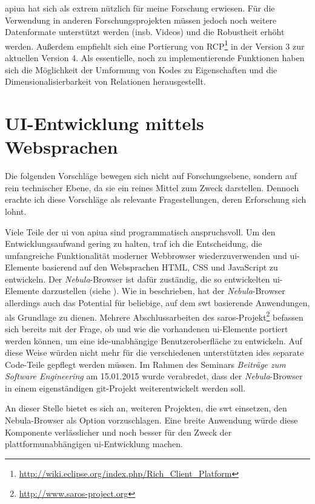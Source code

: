 \gls{apiua} hat sich als extrem nützlich für meine Forschung erwiesen. Für die Verwendung in anderen Forschungsprojekten müssen jedoch noch weitere Datenformate unterstützt werden (insb. Videos) und die Robustheit erhöht werden. Außerdem empfiehlt sich eine Portierung von RCP\footnote{\url{http://wiki.eclipse.org/index.php/Rich_Client_Platform}} in der Version 3 zur aktuellen Version 4. Als essentielle, noch zu implementierende Funktionen haben sich die Möglichkeit der Umformung von Kodes zu Eigenschaften und die Dimensionalisierbarkeit von Relationen herausgestellt.



\section{UI-Entwicklung mittels Websprachen}

Die folgenden Vorschläge bewegen sich nicht auf Forschungsebene, sondern auf rein technischer Ebene, da sie ein reines Mittel zum Zweck darstellen. Dennoch erachte ich diese Vorschläge als relevante Fragestellungen, deren Erforschung sich lohnt.

Viele Teile der \gls{ui} von \gls{apiua} sind programmatisch anspruchsvoll. Um den Entwicklungsaufwand gering zu halten, traf ich die Entscheidung, die umfangreiche Funktionalität moderner Webbrowser wiederzuverwenden und \gls{ui}-Elemente basierend auf den Websprachen HTML, CSS und JavaScript zu entwickeln. Der \textit{Nebula}-Browser ist dafür zuständig, die so entwickelten \gls{ui}-Elemente darzustellen (siehe ). Wie in  beschrieben, hat der \textit{Nebula}-Browser allerdings auch das Potential für beliebige, auf dem \gls{swt} basierende Anwendungen, als Grundlage zu dienen. Mehrere Abschlussarbeiten des \gls{saros}-Projekt\footnote{\url{http://www.saros-project.org}} befassen sich bereits mit der Frage, ob und wie die vorhandenen \acrshort{ui}-Elemente portiert werden können, um eine \acrshort{ide}-unabhängige Benutzeroberfläche zu entwickeln. Auf diese Weise würden nicht mehr für die verschiedenen unterstützten \acrshort{ide}s separate Code-Teile gepflegt werden müssen. Im Rahmen des Seminars \textit{Beiträge zum Software Engineering} am 15.01.2015 wurde verabredet, dass der \textit{Nebula}-Browser in einem eigenständigen \gls{git}-Projekt weiterentwickelt werden soll.

An dieser Stelle bietet es sich an, weiteren Projekten, die \gls{swt} einsetzen, den Nebula-Browser als Option vorzuschlagen. Eine breite Anwendung würde diese Komponente verlässlicher und noch besser für den Zweck der plattformunabhängigen \acrshort{ui}-Entwicklung machen.

